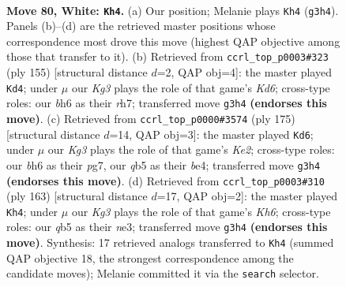 \documentclass[11pt]{article}
\begin{document}
\clearpage

\begin{figure}[p]\centering
\begin{subfigure}{0.46\textwidth}\centering
\resizebox{\linewidth}{!}{%
\newchessgame
\chessboard[
  setfen={8/2k5/7b/1q6/8/6K1/8/5q2 w - - 2 80},
  showmover=false,
  pgfstyle=straightmove, color=movearrow, markmove={g3-h4}
]}
\caption{}
\end{subfigure}\hfill
\begin{subfigure}{0.46\textwidth}\centering
\resizebox{\linewidth}{!}{%
\newchessgame
\chessboard[
  setfen={Q3Q3/7R/8/5K2/8/3k4/8/8 b - - 0 78},
  showmover=false,
  pgfstyle=straightmove, color=movearrow, markmove={d3-d4}
]}
\caption{}
\end{subfigure}
\\[4pt]
\begin{subfigure}{0.46\textwidth}\centering
\resizebox{\linewidth}{!}{%
\newchessgame
\chessboard[
  setfen={Q7/4k1P1/7K/8/4B3/8/8/8 b - - 0 88},
  showmover=false,
  pgfstyle=straightmove, color=movearrow, markmove={e7-d6}
]}
\caption{}
\end{subfigure}\hfill
\begin{subfigure}{0.46\textwidth}\centering
\resizebox{\linewidth}{!}{%
\newchessgame
\chessboard[
  setfen={8/8/8/8/8/4N2k/1K6/6Q1 b - - 0 82},
  showmover=false,
  pgfstyle=straightmove, color=movearrow, markmove={h3-h4}
]}
\caption{}
\end{subfigure}
\caption{\textbf{Move 80, White: \texttt{Kh4}.} (a) Our position; Melanie plays \texttt{Kh4} (\texttt{g3h4}). Panels (b)--(d) are the retrieved master positions whose correspondence most drove this move (highest QAP objective among those that transfer to it). (b) Retrieved from \texttt{ccrl\_top\_p0003\#323} (ply 155) [structural distance $d$=2, QAP obj=4]: the master played \texttt{Kd4}; under $\mu$ our \emph{Kg3} plays the role of that game's \emph{Kd6}; cross-type roles: our \emph{b}h6 as their \emph{r}h7; transferred move \texttt{g3h4} \textbf{(endorses this move)}. (c) Retrieved from \texttt{ccrl\_top\_p0000\#3574} (ply 175) [structural distance $d$=14, QAP obj=3]: the master played \texttt{Kd6}; under $\mu$ our \emph{Kg3} plays the role of that game's \emph{Ke2}; cross-type roles: our \emph{b}h6 as their \emph{p}g7, our \emph{q}b5 as their \emph{b}e4; transferred move \texttt{g3h4} \textbf{(endorses this move)}. (d) Retrieved from \texttt{ccrl\_top\_p0003\#310} (ply 163) [structural distance $d$=17, QAP obj=2]: the master played \texttt{Kh4}; under $\mu$ our \emph{Kg3} plays the role of that game's \emph{Kh6}; cross-type roles: our \emph{q}b5 as their \emph{n}e3; transferred move \texttt{g3h4} \textbf{(endorses this move)}. Synthesis: 17 retrieved analogs transferred to \texttt{Kh4} (summed QAP objective 18, the strongest correspondence among the candidate moves); Melanie committed it via the \texttt{search} selector.}
\label{fig:thought-m158}
\end{figure}
\end{document}
